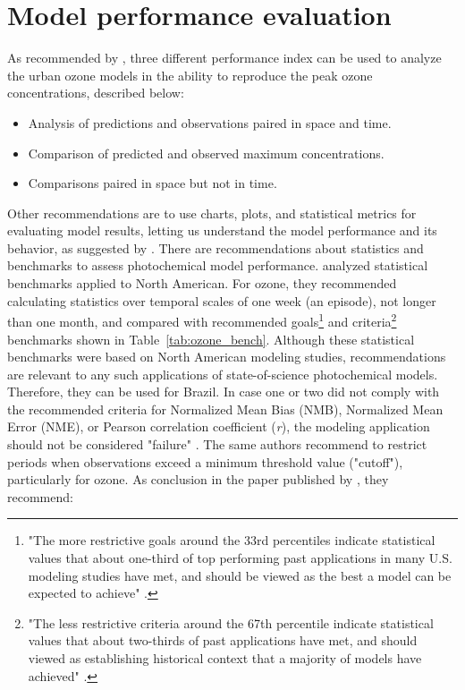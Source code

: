   \section{Model performance evaluation}
  As recommended by \citet{Seinfeld2016}, three different performance index can be used to analyze the urban ozone models in the ability to reproduce the peak ozone concentrations, described below:
  
  \begin{itemize}
  	\item Analysis of predictions and observations paired in space and time.
  	\item Comparison of predicted and observed maximum concentrations.
  	\item Comparisons paired in space but not in time.
  \end{itemize}
  
Other recommendations are to use charts, plots, and statistical metrics for evaluating model results, letting us understand the model performance and its behavior, as suggested by \citet{Emery2017}.
  There are recommendations about statistics and benchmarks to assess photochemical model performance.
  \citet{Emery2017} analyzed statistical benchmarks applied to North American.
  For ozone, they recommended calculating statistics over temporal scales of one week (an episode), not longer than one month, and compared with recommended goals\footnote{"The more restrictive goals around the 33rd percentiles indicate statistical values that about one-third of top performing past applications in many U.S. modeling studies have met, and should be viewed as the best a model can be expected to achieve" \citep[defined in][]{Emery2017}.} and criteria\footnote{"The less restrictive criteria around the 67th percentile indicate statistical values that about two-thirds of past applications have met, and should viewed as establishing historical context that a majority of models have achieved" \citep[defined in][]{Emery2017}.} benchmarks shown in Table~\ref{tab:ozone_bench}.
  Although these statistical benchmarks were based on  North American modeling studies, \citet{Emery2017} recommendations are relevant to any such applications of state-of-science photochemical models.
  Therefore, they can be used for Brazil.
  In case one or two did not comply with the recommended criteria for Normalized Mean Bias (NMB), Normalized Mean Error (NME), or Pearson correlation coefficient (\textit{r}), the modeling application should not be considered "failure" \citep{Emery2017}.
  The same authors recommend to restrict periods when observations exceed a minimum threshold value ("cutoff"), particularly for ozone. As conclusion in the paper published by \citet{Emery2017}, they recommend:
  

